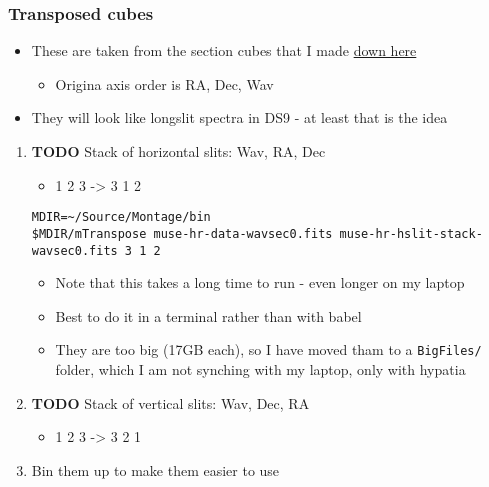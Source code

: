\documentclass[11pt]{article}
\begin{document}
\subsubsection{Transposed cubes}
\label{sec:orgheadline15}
\begin{itemize}
\item These are taken from the section cubes that I made \hyperref[sec:orgheadline10]{down here}
\begin{itemize}
\item Origina axis order is RA, Dec, Wav
\end{itemize}
\item They will look like longslit spectra in DS9 - at least that is the idea
\end{itemize}

\begin{enumerate}
\item {\bfseries\sffamily TODO} Stack of horizontal slits: Wav, RA, Dec
\label{sec:orgheadline11}
\begin{itemize}
\item 1 2 3 -> 3 1 2
\end{itemize}
\begin{verbatim}
MDIR=~/Source/Montage/bin
$MDIR/mTranspose muse-hr-data-wavsec0.fits muse-hr-hslit-stack-wavsec0.fits 3 1 2
\end{verbatim}

\begin{itemize}
\item Note that this takes a long time to run - even longer on my laptop
\item Best to do it in a terminal rather than with babel
\item They are too big (17GB each), so I have moved tham to a \texttt{BigFiles/} folder, which I am not synching with my laptop, only with hypatia
\end{itemize}

\item {\bfseries\sffamily TODO} Stack of vertical slits: Wav, Dec, RA
\label{sec:orgheadline12}
\begin{itemize}
\item 1 2 3 -> 3 2 1
\end{itemize}

\item Bin them up to make them easier to use
\label{sec:orgheadline14}


\end{enumerate}
\end{document}
